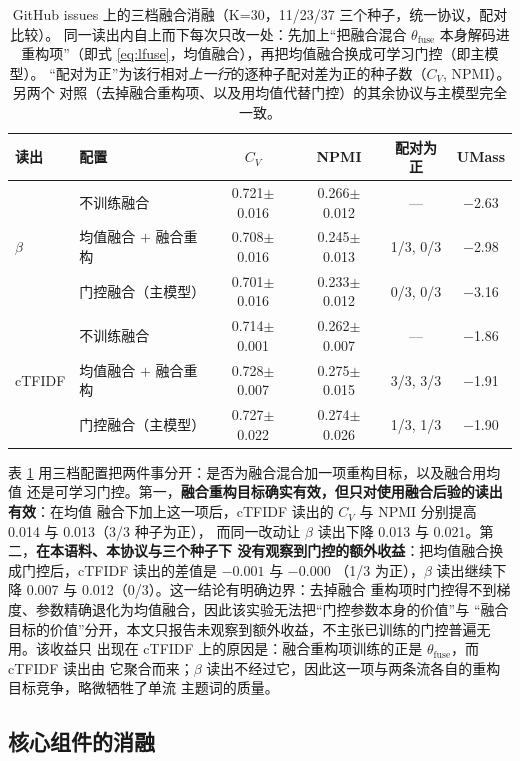 \documentclass[11pt]{ctexart}
\begin{document}
\begin{table}[t]
\centering
\caption{GitHub issues 上的三档融合消融（K=30，11/23/37 三个种子，统一协议，配对比较）。
同一读出内自上而下每次只改一处：先加上“把融合混合 $\theta_{\mathrm{fuse}}$ 本身解码进
重构项”（即式 \eqref{eq:lfuse}，均值融合），再把均值融合换成可学习门控（即主模型）。
“配对为正”为该行相对\emph{上一行}的逐种子配对差为正的种子数（$C_V$, NPMI）。另两个
对照（去掉融合重构项、以及用均值代替门控）的其余协议与主模型完全一致。}
\label{tab:fusion}
\small
\begin{tabular}{llcccc}
\toprule
读出 & 配置 & $C_V$ & NPMI & 配对为正 & UMass \\
\midrule
\multirow{3}{*}{$\beta$} & 不训练融合 & 0.721$\pm$0.016 & 0.266$\pm$0.012 & --- & $-$2.63 \\
 & 均值融合 $+$ 融合重构 & 0.708$\pm$0.016 & 0.245$\pm$0.013 & 1/3, 0/3 & $-$2.98 \\
 & 门控融合（主模型） & 0.701$\pm$0.016 & 0.233$\pm$0.012 & 0/3, 0/3 & $-$3.16 \\
\midrule
\multirow{3}{*}{cTFIDF} & 不训练融合 & 0.714$\pm$0.001 & 0.262$\pm$0.007 & --- & $-$1.86 \\
 & 均值融合 $+$ 融合重构 & 0.728$\pm$0.007 & 0.275$\pm$0.015 & 3/3, 3/3 & $-$1.91 \\
 & 门控融合（主模型） & 0.727$\pm$0.022 & 0.274$\pm$0.026 & 1/3, 1/3 & $-$1.90 \\
\bottomrule
\end{tabular}
\end{table}

表 \ref{tab:fusion} 用三档配置把两件事分开：是否为融合混合加一项重构目标，以及融合用均值
还是可学习门控。第一，\textbf{融合重构目标确实有效，但只对使用融合后验的读出有效}：在均值
融合下加上这一项后，cTFIDF 读出的 $C_V$ 与 NPMI 分别提高 0.014 与 0.013（3/3 种子为正），
而同一改动让 $\beta$ 读出下降 0.013 与 0.021。第二，\textbf{在本语料、本协议与三个种子下
没有观察到门控的额外收益}：把均值融合换成门控后，cTFIDF 读出的差值是 $-0.001$ 与 $-0.000$
（1/3 为正），$\beta$ 读出继续下降 0.007 与 0.012（0/3）。这一结论有明确边界：去掉融合
重构项时门控得不到梯度、参数精确退化为均值融合，因此该实验无法把“门控参数本身的价值”与
“融合目标的价值”分开，本文只报告未观察到额外收益，不主张已训练的门控普遍无用。该收益只
出现在 cTFIDF 上的原因是：融合重构项训练的正是 $\theta_{\mathrm{fuse}}$，而 cTFIDF 读出由
它聚合而来；$\beta$ 读出不经过它，因此这一项与两条流各自的重构目标竞争，略微牺牲了单流
主题词的质量。

\subsection{核心组件的消融}
\end{document}
